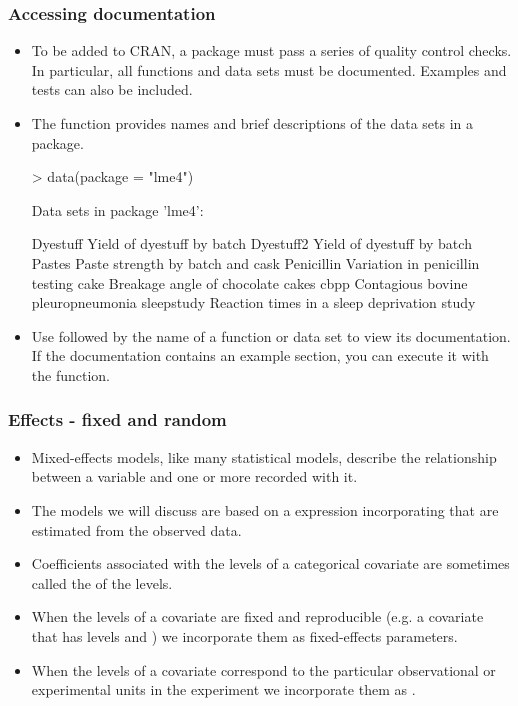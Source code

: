 \begin{frame}[fragile]
\frametitle{Accessing documentation}
\begin{itemize}
  \item To be added to CRAN, a package must pass a series of quality
    control checks.  In particular, all functions and data sets must
    be documented.  Examples and tests can also be included.
  \item The  function provides names and brief descriptions
    of the data sets in a package.
    \begin{Schunk}
      \begin{Sinput}
> data(package = "lme4")        
      \end{Sinput}
      \begin{Soutput}
Data sets in package 'lme4':

Dyestuff                Yield of dyestuff by batch
Dyestuff2               Yield of dyestuff by batch
Pastes                  Paste strength by batch and cask
Penicillin              Variation in penicillin testing
cake                    Breakage angle of chocolate cakes
cbpp                    Contagious bovine pleuropneumonia
sleepstudy              Reaction times in a sleep deprivation study
      \end{Soutput}
    \end{Schunk}
  \item Use  followed by the name of a function or data set to
    view its documentation.  If the documentation contains an example
    section, you can execute it with the  function.
\end{itemize}
\end{frame}

\begin{frame}
  \frametitle{Effects - fixed and random}
  \begin{itemize}
  \item Mixed-effects models, like many statistical models, describe
    the relationship between a  variable and one or
    more  recorded with it.
  \item The models we will discuss are based on a  expression incorporating  that are
    estimated from the observed data.
  \item Coefficients associated with the levels of a categorical
    covariate are sometimes called the  of the levels.
  \item When the levels of a covariate are fixed and reproducible
    (e.g. a covariate  that has levels  and
    ) we incorporate them as fixed-effects parameters.
  \item When the levels of a covariate correspond to the particular
    observational or experimental units in the experiment we
    incorporate them as .
  \end{itemize}
\end{frame}


